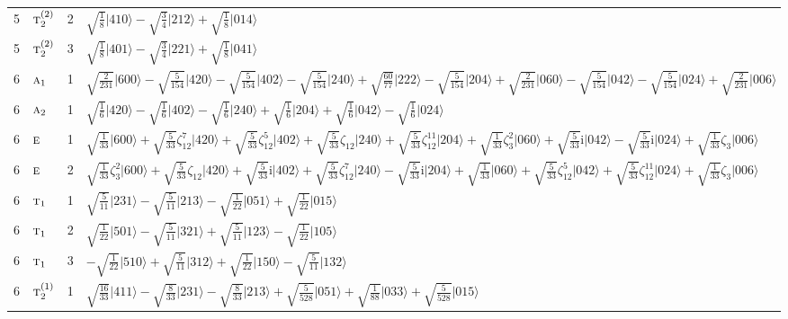 \documentclass[11pt]{article}
\newcommand{\irr}[1]{\text{\normalfont\scshape #1}}
\newcommand{\iunit}{\mathrm{i}}
\newcommand{\rootunity}[1]{\zeta_{#1}}
\newcommand{\occ}[1]{\lvert #1\rangle}
\begin{document}
\begin{longtable}{c l c p{}}
5 & $\irr{t}_{2}^{(2)}$ & 2 & $\sqrt{\tfrac{1}{8}}\occ{410}-\sqrt{\tfrac{3}{4}}\occ{212}+\sqrt{\tfrac{1}{8}}\occ{014}$\\
5 & $\irr{t}_{2}^{(2)}$ & 3 & $\sqrt{\tfrac{1}{8}}\occ{401}-\sqrt{\tfrac{3}{4}}\occ{221}+\sqrt{\tfrac{1}{8}}\occ{041}$\\
\hline
6 & $\irr{a}_{1}$ & 1 & $\sqrt{\tfrac{2}{231}}\occ{600}-\sqrt{\tfrac{5}{154}}\occ{420}-\sqrt{\tfrac{5}{154}}\occ{402}-\sqrt{\tfrac{5}{154}}\occ{240}+\sqrt{\tfrac{60}{77}}\occ{222}-\sqrt{\tfrac{5}{154}}\occ{204}+\sqrt{\tfrac{2}{231}}\occ{060}-\sqrt{\tfrac{5}{154}}\occ{042}-\sqrt{\tfrac{5}{154}}\occ{024}+\sqrt{\tfrac{2}{231}}\occ{006}$\\
6 & $\irr{a}_{2}$ & 1 & $\sqrt{\tfrac{1}{6}}\occ{420}-\sqrt{\tfrac{1}{6}}\occ{402}-\sqrt{\tfrac{1}{6}}\occ{240}+\sqrt{\tfrac{1}{6}}\occ{204}+\sqrt{\tfrac{1}{6}}\occ{042}-\sqrt{\tfrac{1}{6}}\occ{024}$\\
6 & $\irr{e}$ & 1 & $\sqrt{\tfrac{1}{33}}\occ{600}+\sqrt{\tfrac{5}{33}}\rootunity{12}^{7}\occ{420}+\sqrt{\tfrac{5}{33}}\rootunity{12}^{5}\occ{402}+\sqrt{\tfrac{5}{33}}\rootunity{12}\occ{240}+\sqrt{\tfrac{5}{33}}\rootunity{12}^{11}\occ{204}+\sqrt{\tfrac{1}{33}}\rootunity{3}^{2}\occ{060}+\sqrt{\tfrac{5}{33}}\iunit\occ{042}-\sqrt{\tfrac{5}{33}}\iunit\occ{024}+\sqrt{\tfrac{1}{33}}\rootunity{3}\occ{006}$\\
6 & $\irr{e}$ & 2 & $\sqrt{\tfrac{1}{33}}\rootunity{3}^{2}\occ{600}+\sqrt{\tfrac{5}{33}}\rootunity{12}\occ{420}+\sqrt{\tfrac{5}{33}}\iunit\occ{402}+\sqrt{\tfrac{5}{33}}\rootunity{12}^{7}\occ{240}-\sqrt{\tfrac{5}{33}}\iunit\occ{204}+\sqrt{\tfrac{1}{33}}\occ{060}+\sqrt{\tfrac{5}{33}}\rootunity{12}^{5}\occ{042}+\sqrt{\tfrac{5}{33}}\rootunity{12}^{11}\occ{024}+\sqrt{\tfrac{1}{33}}\rootunity{3}\occ{006}$\\
6 & $\irr{t}_{1}$ & 1 & $\sqrt{\tfrac{5}{11}}\occ{231}-\sqrt{\tfrac{5}{11}}\occ{213}-\sqrt{\tfrac{1}{22}}\occ{051}+\sqrt{\tfrac{1}{22}}\occ{015}$\\
6 & $\irr{t}_{1}$ & 2 & $\sqrt{\tfrac{1}{22}}\occ{501}-\sqrt{\tfrac{5}{11}}\occ{321}+\sqrt{\tfrac{5}{11}}\occ{123}-\sqrt{\tfrac{1}{22}}\occ{105}$\\
6 & $\irr{t}_{1}$ & 3 & $-\sqrt{\tfrac{1}{22}}\occ{510}+\sqrt{\tfrac{5}{11}}\occ{312}+\sqrt{\tfrac{1}{22}}\occ{150}-\sqrt{\tfrac{5}{11}}\occ{132}$\\
6 & $\irr{t}_{2}^{(1)}$ & 1 & $\sqrt{\tfrac{16}{33}}\occ{411}-\sqrt{\tfrac{8}{33}}\occ{231}-\sqrt{\tfrac{8}{33}}\occ{213}+\sqrt{\tfrac{5}{528}}\occ{051}+\sqrt{\tfrac{1}{88}}\occ{033}+\sqrt{\tfrac{5}{528}}\occ{015}$\\

\end{longtable}
\end{document}
